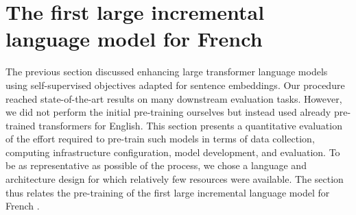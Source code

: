\setchapterpreamble[u]{\margintoc}
\chapter{The first large incremental language model for French}



The previous section discussed enhancing large transformer language models using self-supervised objectives adapted for sentence embeddings. Our procedure reached state-of-the-art results on many downstream evaluation tasks. However, we did not perform the initial pre-training ourselves but instead used already pre-trained transformers for English. This section presents a quantitative evaluation of the effort required to pre-train such models in terms of data collection, computing infrastructure configuration, model development, and evaluation. To be as representative as possible of the process, we chose a language and architecture design for which relatively few resources
were available. The section thus relates the pre-training of the first large incremental language model for French \parencite{simoulin_2021c}.

